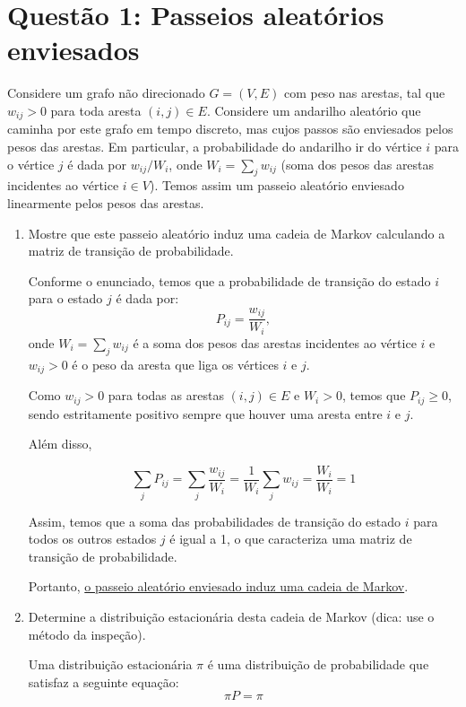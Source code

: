 \section*{Questão 1: Passeios aleatórios enviesados}
Considere um grafo não direcionado $G = (V,E)$ com peso nas arestas, tal que $w_{ij} > 0$ para toda aresta $(i, j) \in E$. Considere um andarilho aleatório que caminha por este grafo em tempo discreto, mas cujos passos são enviesados pelos pesos das arestas. Em particular, a probabilidade do andarilho ir do vértice $i$ para o vértice $j$ é dada por $w_{ij}/W_i$, onde $W_i = \sum_j w_{ij}$ (soma dos pesos das arestas incidentes ao vértice $i \in V$). Temos assim um passeio aleatório enviesado linearmente pelos pesos das arestas.

\begin{enumerate}
    \item Mostre que este passeio aleatório induz uma cadeia de Markov calculando a matriz de transição de probabilidade.
    \begin{resposta}
        
    Conforme o enunciado, temos que a probabilidade de transição do estado $i$ para o estado $j$ é dada por:
    $$ P_{ij} = \frac{w_{ij}}{W_i}, $$
    onde $W_i = \sum_{j} w_{ij}$ é a soma dos pesos das arestas incidentes ao vértice $i$ e $w_{ij}>0$ é o peso da aresta que liga os vértices $i$ e $j$.

    Como $w_{ij} > 0$ para todas as arestas $(i,j) \in E$ e $W_i > 0$, temos que $P_{ij} \geq 0$, sendo estritamente positivo sempre que houver uma aresta entre $i$ e $j$.

    
    Além disso,

    $$ \sum_{j} P_{ij} = \sum_{j} \frac{w_{ij}}{W_i} = \frac{1}{W_i} \sum_{j} w_{ij} = \frac{W_i}{W_i} = 1 $$

    Assim, temos que a soma das probabilidades de transição do estado $i$ para todos os outros estados $j$ é igual a 1, o que caracteriza uma matriz de transição de probabilidade. 
    
    Portanto, \underline{o passeio aleatório enviesado induz uma cadeia de Markov}.
        
    \end{resposta}
    \item Determine a distribuição estacionária desta cadeia de Markov (dica: use o método da inspeção).
    \begin{resposta}
        Uma distribuição estacionária $\pi$ é uma distribuição de probabilidade que satisfaz a seguinte equação:
        $$ \pi P = \pi $$


\end{resposta}
\end{enumerate}
